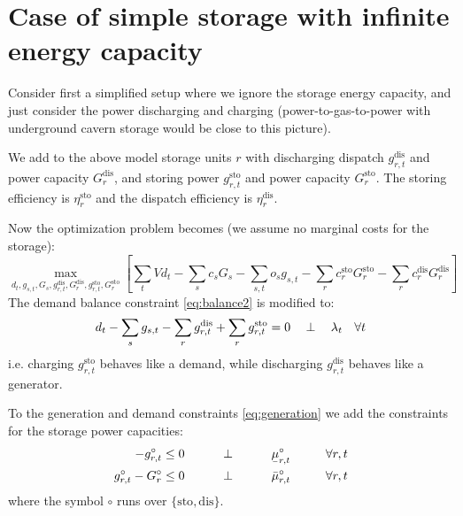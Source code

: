 \documentclass[final,3p,times]{elsarticle}
\newcommand{\ubar}[1]{\text{\b{$#1$}}}
\def\l{\lambda}
\begin{document}
\section{Case of simple storage with infinite energy capacity}\label{sec:simple}

Consider first a simplified setup where we ignore the storage energy
capacity, and just consider the power discharging and charging
(power-to-gas-to-power with underground cavern storage would be close to this
picture).

We add to the above model storage units $r$ with discharging dispatch $g^{\textrm{dis}}_{r,t}$ and power capacity $G^{\textrm{dis}}_{r}$, and storing power $g^{\textrm{sto}}_{r,t}$ and power capacity $G^{\textrm{sto}}_{r}$. The storing efficiency is $\eta_r^{\textrm{sto}}$ and the dispatch efficiency is $\eta_r^{\textrm{dis}}$.

Now the optimization problem becomes (we assume no marginal costs for the storage):
\begin{equation}
    \max_{d_{t}, g_{s,t}, G_s,g^{\textrm{dis}}_{r,t},G^{\textrm{dis}}_{r},g^{\textrm{sto}}_{r,t},G^{\textrm{sto}}_{r}}\left[\sum_{t} Vd_{t} -  \sum_s c_s G_s - \sum_{s,t} o_{s} g_{s,t} -\sum_r c^{\textrm{sto}}_r G^{\textrm{sto}}_r -\sum_r c^{\textrm{dis}}_r G^{\textrm{dis}}_r\right]  \label{eq:objsr}
\end{equation}
The demand balance constraint \eqref{eq:balance2} is modified to:
\begin{align}
   d_{t} - \sum_s g_{s,t} - \sum_r g^{\textrm{dis}}_{r,t} + \sum_r g^{\textrm{sto}}_{r,t}  =  0 \hspace{0.34cm}\perp \hspace{0.34cm} \l_t \hspace{0.34cm} \forall t \label{eq:balance3}
\end{align}
i.e. charging $g^{\textrm{sto}}_{r,t}$ behaves like a demand, while discharging $g^{\textrm{dis}}_{r,t}$ behaves like a generator.

To the generation and demand constraints \eqref{eq:generation} we add the constraints for the storage power capacities:
\begin{align}
    -g^\circ_{r,t}\leq 0 \hspace{1cm}\perp \hspace{1cm} \ubar{\mu}^\circ_{r,t} \hspace{1cm} \forall r,t  \label{eq:storlower2}\\
    g^\circ_{r,t} - G^\circ_r \leq 0 \hspace{1cm}\perp \hspace{1cm} \bar{\mu}^\circ_{r,t} \hspace{1cm} \forall r,t \label{eq:storupper2}
\end{align}
where the symbol $\circ$ runs over $\{\textrm{sto},\textrm{dis}\}$.
\end{document}
